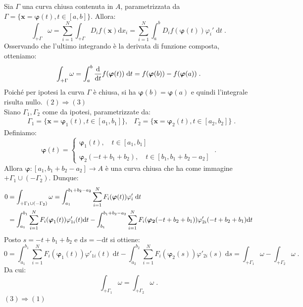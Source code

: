 \documentclass[a4paper,12pt]{report}
\theoremstyle{plain}
\theoremstyle{definition}
\theoremstyle{remark}
\newcommand{\BF}[1]{\boldsymbol{#1}}
\newcommand{\diff}[1]{\mathrm{d}#1}
\numberwithin{equation}{section}
\begin{document}
Sia $\Gamma$ una curva chiusa contenuta in $A$, parametrizzata da $\Gamma=\{\mathbf{x}=\boldsymbol{\varphi}(t),t\in[a,b]\}$. Allora:
\begin{equation}
\int_{+\Gamma}\omega=\sum_{i=1}^N\int_{+\Gamma}D_if(\mathbf{x})\diff{x}_i=\sum_{i=1}^N\int_a^b D_if(\boldsymbol{\varphi}(t))\varphi_i'\;\diff{t}\;.
\end{equation}
Osservando che l'ultimo integrando è la derivata di funzione composta, otteniamo:
\begin{equation}
\int_{+\Gamma}\omega=\int_a^b\frac{\diff}{\diff{t}}f(\boldsymbol{\varphi}(t))\;\diff{t}=f(\boldsymbol{\varphi}(b))-f(\boldsymbol{\varphi}(a))\;.
\end{equation}
Poiché per ipotesi la curva $\Gamma$ è chiusa, si ha $\boldsymbol{\varphi}(b)=\boldsymbol{\varphi}(a)$ e quindi l'integrale risulta nullo.
\endproof
\proof $(2)\Longrightarrow(3)$ \\

Siano $\Gamma_1,\Gamma_2$ come da ipotesi, parametrizzate da:
\begin{align}
&\Gamma_1=\{\mathbf{x}=\BF{\varphi}_1(t), t\in [a_1,b_1]\}, &\Gamma_2=\{\mathbf{x}=\BF{\varphi}_2(t), t\in [a_2,b_2]\}\;.
\end{align}
Definiamo:
\begin{equation}
\boldsymbol{\varphi}(t)=\begin{cases}
                         \boldsymbol{\varphi}_1(t),\quad t\in[a_1,b_1] \\
\\
\boldsymbol{\varphi}_2(-t+b_1+b_2),\quad t\in[b_1,b_1+b_2-a_2]
                        \end{cases}\;.
\end{equation}
Allora $\boldsymbol{\varphi}:[a_1,b_1+b_2-a_2]\to A$ è una curva chiusa che ha come immagine $+\Gamma_1\cup(-\Gamma_2)$. Dunque:
\begin{align}
0 &= \int_{+\Gamma_1\cup(-\Gamma_2)}\omega =\int_{a_1}^{b_1+b_2-a_2}\sum_{i=1}^N F_i(\BF{\varphi}(t))\varphi'_i\;\diff{t}\notag \\
&=\int_{a_1}^{b_1}\sum_{i=1}^NF_i(\BF{\varphi}_1(t))\varphi_{1i}'(t)\diff{t}-\int_{b_1}^{b_1+b_2-a_2}\sum_{i=1}^NF_i(\BF{\varphi_2}(-t+b_2+b_1))\varphi_{2i}'(-t+b_2+b_1)\diff{t}
\end{align}
Posto $s=-t+b_1+b_2$ e $\diff{s}=-\diff{t}$ si ottiene:
\begin{equation}
0=\int_{a_1}^{b_1}\sum_{i=1}^N F_i(\boldsymbol{\varphi}_1(t))\varphi'_{1i}(t)\;\diff{t}-\int_{a_2}^{b_2}\sum_{i=1}^NF_i(\boldsymbol{\varphi}_2(s))\varphi'_{2i}(s)\;\diff{s}=\int_{+\Gamma_1}\omega-\int_{+\Gamma_2}\omega\;.
\end{equation}
Da cui:
\begin{equation}
\int_{+\Gamma_1}\omega=\int_{+\Gamma_2}\omega\;.
\end{equation}
\endproof
\proof $(3)\Longrightarrow(1)$ \\
\end{document}
